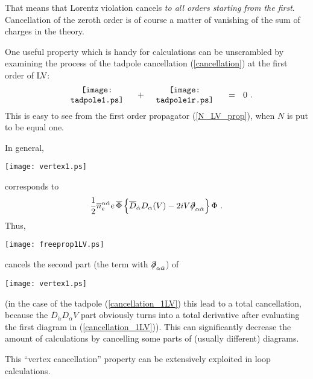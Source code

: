 \documentclass[a4paper,12pt]{article}
\newcommand{\slashed}[1]{\hbox{{$#1$}\llap{$/$}}}
\begin{document}
	That means that Lorentz violation cancels
	{\it to all orders starting from the first}.
	Cancellation of the zeroth order is of course
	a matter of vanishing of the sum of charges 
	in the theory.

	One useful property which is handy for calculations
	can be unscrambled by examining the process of the
	tadpole cancellation (\ref{cancellation}) at the first 
	order of LV:
\begin{equation}
\label{cancellation_1LV}
	\begin{minipage}[c]{3.0cm}
	\centering
	\texttt{[image: tadpole1.ps]} 
	\end{minipage}
	~+~
	\begin{minipage}[c]{3.0cm}
	\centering
	\texttt{[image: tadpole1r.ps]} 
	\end{minipage}
	~~=~~
	0
	~.
\end{equation}
	This is easy to see from the first order propagator
	(\ref{N_LV_prop}), when $ N $ is put to be equal one.

	In general, 
\begin{minipage}[b]{1.5cm}
\centering
\texttt{[image: vertex1.ps]} 
\vspace{-0.1cm}
\end{minipage}
	corresponds to
\[
	\frac{1}{2} \overline{n}_e^{\alpha\dot\alpha}
	e\, \overline{\Phi}\,
	\Bigl\{
		\overline{D}_{\dot\alpha} D_\alpha ( V )
		- 
		2 i V \slashed{\partial}_{\alpha\dot\alpha}
	\Bigr\}\,
	 \Phi
	~.
\] 
	Thus, 
\begin{minipage}[b]{1.7cm}
\centering
\texttt{[image: freeprop1LV.ps]} 
\vspace{-0.06cm}
\end{minipage}
	cancels the second part
	(the term with $ \slashed{\partial}_{\alpha\dot\alpha}$)
	of 
\begin{minipage}[b]{1.5cm}
\centering
\texttt{[image: vertex1.ps]} 
\vspace{-0.1cm}
\end{minipage}
	(in the case of the tadpole (\ref{cancellation_1LV}) 
	this lead to a total 
	cancellation,
	because the 
	$ \overline{D}_{\dot\alpha} D_\alpha V $
	part obviously turns into a total derivative after evaluating
	the first diagram in (\ref{cancellation_1LV})).
	This can significantly decrease the amount of calculations
	by cancelling some parts of (usually different) diagrams.

	This ``vertex cancellation'' property can be extensively
	exploited in loop calculations.
\end{document}
